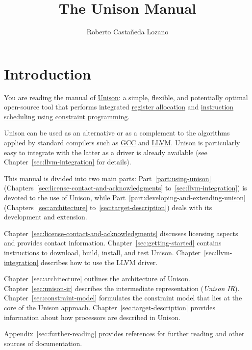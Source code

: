 \documentclass[11pt]{report}
\title{The Unison Manual}
\author{Roberto Castañeda Lozano}
\date{}
\begin{document}
\maketitle

\setcounter{tocdepth}{2}
\tableofcontents

\chapter*{Introduction}

You are reading the manual of \href{http://unison-code.github.io/}{Unison}: a
simple, flexible, and potentially optimal open-source tool that performs
integrated \href{https://en.wikipedia.org/wiki/Register_allocation}{register
  allocation} and
\href{https://en.wikipedia.org/wiki/Instruction_scheduling}{instruction
  scheduling} using
\href{https://en.wikipedia.org/wiki/Constraint_programming}{constraint
  programming}.

Unison can be used as an alternative or as a complement to the algorithms
applied by standard compilers such as \href{https://gcc.gnu.org/}{GCC} and
\href{http://llvm.org/}{LLVM}.
%
Unison is particularly easy to integrate with the latter as a driver is already
available (see Chapter~\ref{sec:llvm-integration} for details).

This manual is divided into two main parts: Part~\ref{part:using-unison}
(Chapters~\ref{sec:license-contact-and-acknowledgments}
to~\ref{sec:llvm-integration}) is devoted to the use of Unison, while
Part~\ref{part:developing-and-extending-unison} (Chapters~\ref{sec:architecture}
to~\ref{sec:target-description}) deals with its development and extension.

Chapter~\ref{sec:license-contact-and-acknowledgments} discusses licensing
aspects and provides contact information.
%
Chapter~\ref{sec:getting-started} contains instructions to download, build,
install, and test Unison.
%
Chapter~\ref{sec:llvm-integration} describes how to use the LLVM driver.

Chapter~\ref{sec:architecture} outlines the architecture of Unison.
%
Chapter~\ref{sec:unison-ir} describes the intermediate representation
(\emph{Unison IR}).
%
Chapter~\ref{sec:constraint-model} formulates the constraint model that lies at
the core of the Unison approach.
%
Chapter~\ref{sec:target-description} provides information about how processors
are described in Unison.

Appendix~\ref{sec:further-reading} provides references for further reading and
other sources of documentation.
\end{document}

